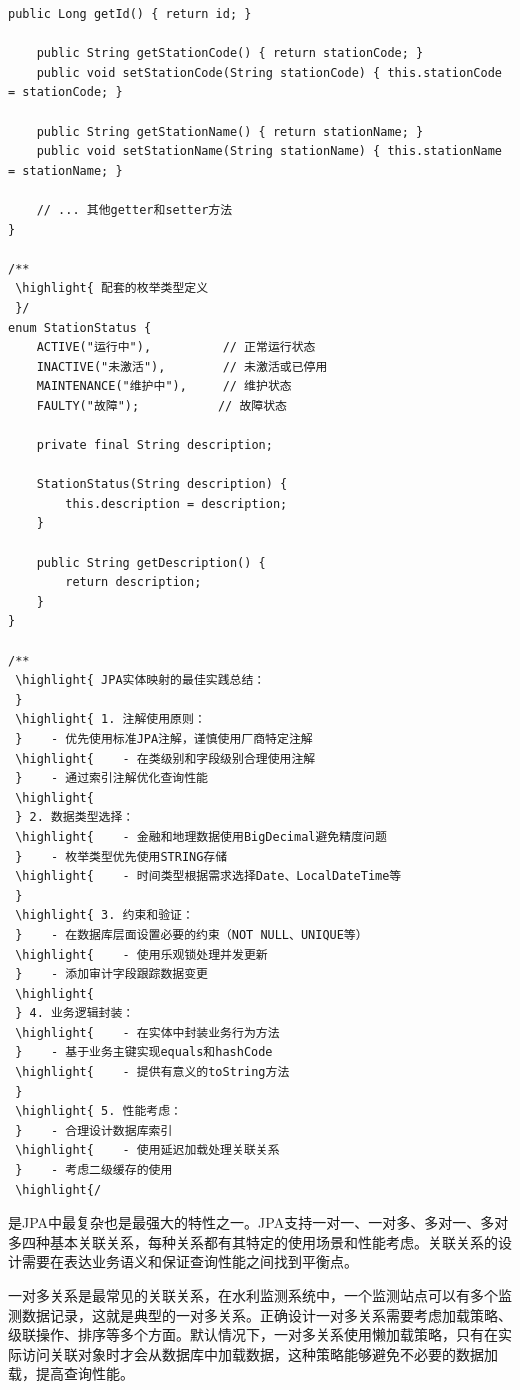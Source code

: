 \begin{lstlisting}[style=java]
    public Long getId() { return id; }
    
    public String getStationCode() { return stationCode; }
    public void setStationCode(String stationCode) { this.stationCode = stationCode; }
    
    public String getStationName() { return stationName; }
    public void setStationName(String stationName) { this.stationName = stationName; }
    
    // ... 其他getter和setter方法
}

/**
 \highlight{ 配套的枚举类型定义
 }/
enum StationStatus {
    ACTIVE("运行中"),          // 正常运行状态
    INACTIVE("未激活"),        // 未激活或已停用
    MAINTENANCE("维护中"),     // 维护状态
    FAULTY("故障");           // 故障状态
    
    private final String description;
    
    StationStatus(String description) {
        this.description = description;
    }
    
    public String getDescription() {
        return description;
    }
}

/**
 \highlight{ JPA实体映射的最佳实践总结：
 } 
 \highlight{ 1. 注解使用原则：
 }    - 优先使用标准JPA注解，谨慎使用厂商特定注解
 \highlight{    - 在类级别和字段级别合理使用注解
 }    - 通过索引注解优化查询性能
 \highlight{ 
 } 2. 数据类型选择：
 \highlight{    - 金融和地理数据使用BigDecimal避免精度问题
 }    - 枚举类型优先使用STRING存储
 \highlight{    - 时间类型根据需求选择Date、LocalDateTime等
 } 
 \highlight{ 3. 约束和验证：
 }    - 在数据库层面设置必要的约束（NOT NULL、UNIQUE等）
 \highlight{    - 使用乐观锁处理并发更新
 }    - 添加审计字段跟踪数据变更
 \highlight{ 
 } 4. 业务逻辑封装：
 \highlight{    - 在实体中封装业务行为方法
 }    - 基于业务主键实现equals和hashCode
 \highlight{    - 提供有意义的toString方法
 } 
 \highlight{ 5. 性能考虑：
 }    - 合理设计数据库索引
 \highlight{    - 使用延迟加载处理关联关系
 }    - 考虑二级缓存的使用
 \highlight{/
\end{lstlisting}

是JPA中最复杂也是最强大的特性之一。JPA支持一对一、一对多、多对一、多对多四种基本关联关系，每种关系都有其特定的使用场景和性能考虑。关联关系的设计需要在表达业务语义和保证查询性能之间找到平衡点。

一对多关系是最常见的关联关系，在水利监测系统中，一个监测站点可以有多个监测数据记录，这就是典型的一对多关系。正确设计一对多关系需要考虑加载策略、级联操作、排序等多个方面。默认情况下，一对多关系使用懒加载策略，只有在实际访问关联对象时才会从数据库中加载数据，这种策略能够避免不必要的数据加载，提高查询性能。

